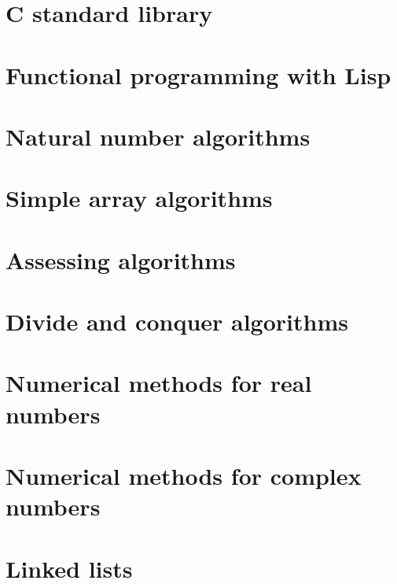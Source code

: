 \documentclass[oneside]{book}
\begin{document}
\part{C standard library}

\part{Functional programming with Lisp}





\part{Natural number algorithms}





\part{Simple array algorithms}






\part{Assessing algorithms}



\part{Divide and conquer algorithms}


\part{Numerical methods for real numbers}







\part{Numerical methods for complex numbers}


\part{Linked lists}


\end{document}
